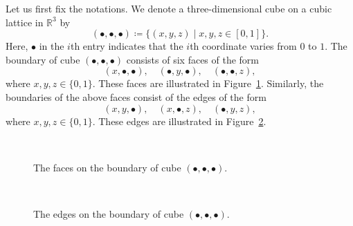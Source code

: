 \documentclass[aps,twocolumn,prx,floatfix,preprintnumbers, nofootinbib,10pt]{revtex4-2}
\numberwithin{equation}{section}
\theoremstyle{definition}
\theoremstyle{remark}
\theoremstyle{claim}
\begin{document}
\vspace*{\baselineskip}
Let us first fix the notations.
We denote a three-dimensional cube on a cubic lattice in $\mathbb{R}^3$ by
\begin{equation}
(\bullet, \bullet, \bullet) \coloneq \{(x, y, z) \mid x, y, z \in [0, 1] \}.
\end{equation}
Here, $\bullet$ in the $i$th entry indicates that the $i$th coordinate varies from $0$ to $1$.
The boundary of cube $(\bullet, \bullet, \bullet)$ consists of six faces of the form
\begin{equation}
(x, \bullet, \bullet), \quad (\bullet, y, \bullet), \quad (\bullet, \bullet, z),
\label{eq: faces}
\end{equation}
where $x, y, z \in \{0, 1\}$.
These faces are illustrated in Figure~\ref{fig: faces}.
Similarly, the boundaries of the above faces consist of the edges of the form
\begin{equation}
(x, y, \bullet), \quad (x, \bullet, z), \quad (\bullet, y, z),
\label{eq: edges}
\end{equation}
where $x, y, z \in \{0, 1\}$.
These edges are illustrated in Figure~\ref{fig: edges}.
\begin{figure}[t]
\centering
{} $\quad$
 $\quad$
\caption{The faces on the boundary of cube $(\bullet, \bullet, \bullet)$.}
\label{fig: faces}
\end{figure}
\begin{figure}[t]
\centering
{} $\quad$
\caption{The edges on the boundary of cube $(\bullet, \bullet, \bullet)$.}
\label{fig: edges}
\end{figure}
\end{document}
